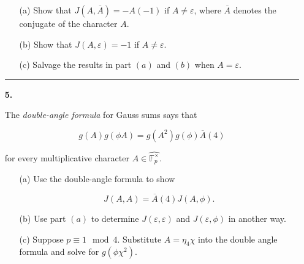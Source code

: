 \documentclass[12pt]{amsart}
\theoremstyle{definition}
\theoremstyle{remark}
\numberwithin{equation}{section}
\def \eps{\varepsilon}
\newcommand{\fphat}
{\widehat{\mathbb{F}_{p}^{\times}}}
\begin{document}
\begin{itemize}
\begin{itemize}
\item[(a)] Show that $J(A,\overline{A}) = -A(-1)$ if $A \neq \eps$, where $\overline{A}$ denotes the conjugate of the character $A$.

\vspace{4mm}

\item[(b)] Show that $J(A, \eps) = -1$ if $A \neq \eps$.

\vspace{4mm}

\item[(c)] Salvage the results in part $(a)$ and $(b)$ when $A = \eps$. 
\end{itemize}

\vspace{8mm}

\hrule{}

\vspace{4mm}

\item[\textbf{5.}]

The \textit{double-angle formula} for Gauss sums says that 

$$g(A)g(\phi A) = g(A^{2})g(\phi)\overline{A}(4)$$

\vspace{2mm}

for every multiplicative character $A \in \fphat$.

\vspace{4mm}


\begin{itemize}
\item[(a)] Use the double-angle formula to show 

$$J(A,A) = \overline{A}(4)J(A, \phi).$$

\vspace{4mm}

\item[(b)] Use part $(a)$ to determine $J(\eps, \eps)$ and $J(\eps,\phi)$ in another way.

\vspace{4mm}

\item[(c)] Suppose $p \equiv 1 \mod 4$. Substitute $A = \eta_{4}\chi$ into the double angle formula and solve for $g(\phi \chi^{2})$.
\end{itemize}

\vspace{4mm}


\end{itemize}
\end{document}
